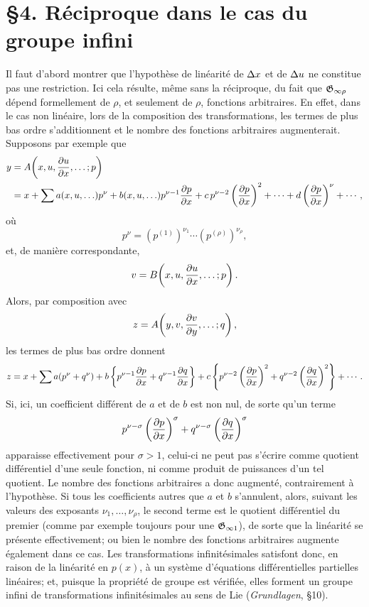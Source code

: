 \section*{\S{}4. Réciproque dans le cas du groupe infini}

Il faut d'abord montrer que l'hypothèse de linéarité de \(\Delta x\) et de \(\Delta u\) ne constitue pas une restriction. Ici cela résulte, même sans la réciproque, du fait que \(\mathfrak G_{\infty\rho}\) dépend formellement de \(\rho\), et seulement de \(\rho\), fonctions arbitraires. En effet, dans le cas non linéaire, lors de la composition des transformations, les termes de plus bas ordre s'additionnent et le nombre des fonctions arbitraires augmenterait. Supposons par exemple que
\[
\begin{aligned}
y&=A\!\left(x,u,\frac{\partial u}{\partial x},\ldots;p\right)\\
&=x+\sum a(x,u,\ldots)p^\nu
+b(x,u,\ldots)p^{\nu-1}\frac{\partial p}{\partial x}
+c\,p^{\nu-2}\left(\frac{\partial p}{\partial x}\right)^2+\cdots
+d\left(\frac{\partial p}{\partial x}\right)^\nu+\cdots,
\end{aligned}
\]
où
\[
p^\nu=(p^{(1)})^{\nu_1}\cdots(p^{(\rho)})^{\nu_\rho},
\]
et, de manière correspondante,
\[
v=B\!\left(x,u,\frac{\partial u}{\partial x},\ldots;p\right).
\]
Alors, par composition avec
\[
z=A\!\left(y,v,\frac{\partial v}{\partial y},\ldots;q\right),
\]
les termes de plus bas ordre donnent
\[
z=x+\sum a(p^\nu+q^\nu)+
b\left\{p^{\nu-1}\frac{\partial p}{\partial x}+q^{\nu-1}\frac{\partial q}{\partial x}\right\}
+c\left\{p^{\nu-2}\left(\frac{\partial p}{\partial x}\right)^2
+q^{\nu-2}\left(\frac{\partial q}{\partial x}\right)^2\right\}+\cdots.
\]
Si, ici, un coefficient différent de \(a\) et de \(b\) est non nul, de sorte qu'un terme
\[
p^{\nu-\sigma}\left(\frac{\partial p}{\partial x}\right)^\sigma
+q^{\nu-\sigma}\left(\frac{\partial q}{\partial x}\right)^\sigma
\]
apparaisse effectivement pour \(\sigma>1\), celui-ci ne peut pas s'écrire comme quotient différentiel d'une seule fonction, ni comme produit de puissances d'un tel quotient. Le nombre des fonctions arbitraires a donc augmenté, contrairement à l'hypothèse. Si tous les coefficients autres que \(a\) et \(b\) s'annulent, alors, suivant les valeurs des exposants \(\nu_1,\ldots,\nu_\rho\), le second terme est le quotient différentiel du premier (comme par exemple toujours pour une \(\mathfrak G_{\infty1}\)), de sorte que la linéarité se présente effectivement; ou bien le nombre des fonctions arbitraires augmente également dans ce cas. Les transformations infinitésimales satisfont donc, en raison de la linéarité en \(p(x)\), à un système d'équations différentielles partielles linéaires; et, puisque la propriété de groupe est vérifiée, elles forment un \og groupe infini de transformations infinitésimales \fg{} au sens de Lie (\emph{Grundlagen}, \S{}10).

